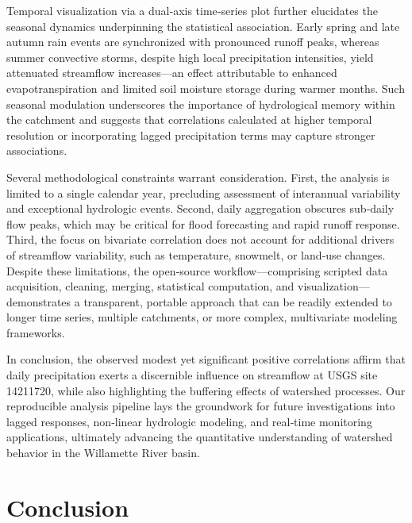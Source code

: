 \documentclass[preprint,12pt]{elsarticle}
\begin{document}
Temporal visualization via a dual‐axis time‐series plot further elucidates the seasonal dynamics underpinning the statistical association. Early spring and late autumn rain events are synchronized with pronounced runoff peaks, whereas summer convective storms, despite high local precipitation intensities, yield attenuated streamflow increases—an effect attributable to enhanced evapotranspiration and limited soil moisture storage during warmer months. Such seasonal modulation underscores the importance of hydrological memory within the catchment and suggests that correlations calculated at higher temporal resolution or incorporating lagged precipitation terms may capture stronger associations.

Several methodological constraints warrant consideration. First, the analysis is limited to a single calendar year, precluding assessment of interannual variability and exceptional hydrologic events. Second, daily aggregation obscures sub‐daily flow peaks, which may be critical for flood forecasting and rapid runoff response. Third, the focus on bivariate correlation does not account for additional drivers of streamflow variability, such as temperature, snowmelt, or land‐use changes. Despite these limitations, the open‐source workflow—comprising scripted data acquisition, cleaning, merging, statistical computation, and visualization—demonstrates a transparent, portable approach that can be readily extended to longer time series, multiple catchments, or more complex, multivariate modeling frameworks.

In conclusion, the observed modest yet significant positive correlations affirm that daily precipitation exerts a discernible influence on streamflow at USGS site 14211720, while also highlighting the buffering effects of watershed processes. Our reproducible analysis pipeline lays the groundwork for future investigations into lagged responses, non‐linear hydrologic modeling, and real‐time monitoring applications, ultimately advancing the quantitative understanding of watershed behavior in the Willamette River basin.

\section{Conclusion}
\end{document}
